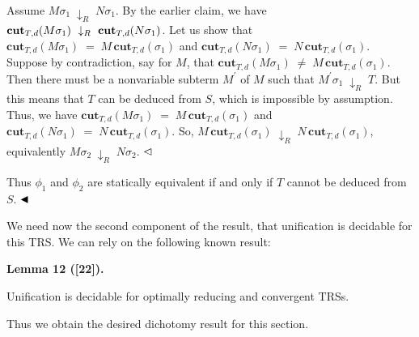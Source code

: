 \documentclass[10pt,a4paper]{amsart}
\begin{document}
Assume $M\sigma_{1}\;\downarrow_{R}\;N\sigma_{1}$. By the earlier claim, we have $\mathbf{cut}_{T,d}(M\sigma_{1})\leavevmode\nobreak\ \downarrow_{R}\leavevmode%
\nobreak\ \mathbf{cut}_{T,d}(N\sigma_{1})$. Let us show that $\mathbf{cut}_{T,d}(M\sigma_{1})\;=\;M\,\textbf{cut}_{T,d}(\sigma_{1})$ and $\mathbf{cut}_{T,d}(N\sigma_{1})\;=\;N\,\textbf{cut}_{T,d}(\sigma_{1})$. Suppose by contradiction, say for $M$, that $\mathbf{cut}_{T,d}(M\sigma_{1})\;\neq\;M\,\textbf{cut}_{T,d}(\sigma_{1})$. Then there must be a nonvariable subterm $M^{\prime}$ of $M$ such that $M^{\prime}\sigma_{1}\;\downarrow_{R}\;T$. But this means that $T$ can be deduced from $S$, which is impossible by assumption. Thus, we have $\mathbf{cut}_{T,d}(M\sigma_{1})\;=\;M\,\textbf{cut}_{T,d}(\sigma_{1})$ and $\mathbf{cut}_{T,d}(N\sigma_{1})\;=\;N\,\textbf{cut}_{T,d}(\sigma_{1})$. So, $M\,\textbf{cut}_{T,d}(\sigma_{1})\;\downarrow_{R}\;N\,\textbf{cut}_{T,d}(%
\sigma_{1})$, equivalently $M\sigma_{2}\;\downarrow_{R}\;N\sigma_{2}$. $\hfill\vartriangleleft$\par
 
 
 
Thus $\phi_{1}$ and $\phi_{2}$ are statically equivalent if and only if $T$ cannot be deduced from $S$. $\hfill\blacktriangleleft$\par
 
 
 
We need now the second component of the result, that unification is decidable for this TRS. We can rely on the following known result:\par
 
 
 
\par\medskip\noindent\textbf{Lemma 12 ([22]).}\par
 
 
Unification is decidable for optimally reducing and convergent TRSs.\par
 
 
 
 
Thus we obtain the desired dichotomy result for this section.\par
 
\end{document}
